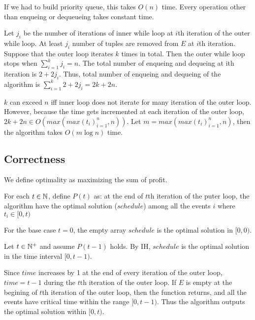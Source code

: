     If we had to build priority queue, this takes $O(n)$ time.
    Every operation other than enqueing or dequeueing takes constant time.
    
    Let $j_i$ be the number of iterations of inner while loop at $i$th iteration of the outer while loop.
    At least $j_i$ number of tuples are removed from $E$ at $i$th iteration.
    Suppose that the outer loop iterates $k$ times in total. 
    Then the outer while loop stops when $\sum_{i=1}^{k} j_i = n$. 
    The total number of enqueing and dequeing at ith iteration is $2 + 2j_i$. 
    Thus, total number of enqueing and dequeing of the algorithm is $\sum_{i=1}^{k} 2 + 2j_i = 2k + 2n$.
    
    $k$ can exceed $n$ iff inner loop does not iterate for many iteration of the outer loop. 
    However, because the time gets incremented at each iteration of the outer loop, $2k + 2n \in O(max(max(t_i)_{i=1}^n, n))$.
    Let $m = max(max(t_i)_{i=1}^n, n)$, then the algorithm takes $O(m \log n)$ time.


    \subsection*{Correctness}

    We define optimality as maximizing the sum of profit.

    For each $t \in \mathbb{N}$, define $P(t)$ as:
    at the end of $t$th iteration of the puter loop, 
    the algorithm have the optimal solution ($schedule$) 
    among all the events $i$ where $t_i \in [0, t)$

    For the base case $t = 0$, the empty array $schedule$ is the optimal solution in $[0, 0)$.

    Let $t \in \mathbb{N}^+$ and assume $P(t - 1)$ holds. 
    By IH, $schedule$ is the optimal solution in the time interval $[0, t-1)$.

    Since $time$ increases by 1 at the end of every iteration of the outer loop, 
    $time = t - 1$ during the $t$th iteration of the outer loop.
    If $E$ is empty at the begining of $t$th iteration of the outer loop, 
    then the function returns, and all the events have critical time within the range $[0, t-1)$. 
    Thus the algorithm outputs the optimal solution within $[0, t)$.

